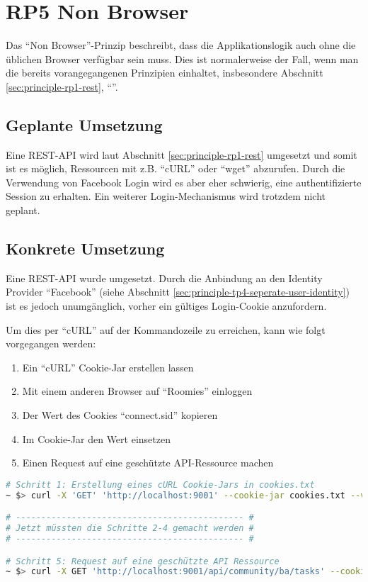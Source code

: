 \section{RP5 Non Browser}
\label{sec:principle-rp5-non-browser}

Das ``Non Browser''-Prinzip beschreibt, dass die Applikationslogik auch ohne die üblichen Browser verfügbar sein muss. Dies ist normalerweise der Fall, wenn man die bereits vorangegangenen Prinzipien einhaltet, insbesondere Abschnitt \ref{sec:principle-rp1-rest}, ``''.

\subsection*{Geplante Umsetzung}
Eine REST-API wird laut Abschnitt \ref{sec:principle-rp1-rest} umgesetzt und somit ist es möglich, Ressourcen mit z.B. ``cURL'' \cite{curl} oder ``wget'' \cite{wget} abzurufen.
Durch die Verwendung von Facebook Login wird es aber eher schwierig, eine authentifizierte Session zu erhalten. Ein weiterer Login-Mechanismus wird trotzdem nicht geplant.

\subsection*{Konkrete Umsetzung}
Eine REST-API wurde umgesetzt. Durch die Anbindung an den Identity Provider ``Facebook'' (siehe Abschnitt \ref{sec:principle-tp4-seperate-user-identity}) ist es jedoch unumgänglich, vorher ein gültiges Login-Cookie anzufordern.

Um dies per ``cURL'' auf der Kommandozeile zu erreichen, kann wie folgt vorgegangen werden:
\begin{enumerate}
	\item Ein ``cURL'' Cookie-Jar erstellen lassen
	\item Mit einem anderen Browser auf ``Roomies'' einloggen
	\item Der Wert des Cookies ``connect.sid'' kopieren
	\item Im Cookie-Jar den Wert einsetzen
	\item Einen Request auf eine geschützte API-Ressource machen
\end{enumerate}

\begin{lstlisting}[language=Bash, caption=cURL Request auf Roomies, label=lst:curlRoomiesAPI]
# Schritt 1: Erstellung eines cURL Cookie-Jars in cookies.txt
~ $> curl -X 'GET' 'http://localhost:9001' --cookie-jar cookies.txt --verbose --location

# --------------------------------------------- #
# Jetzt müssten die Schritte 2-4 gemacht werden #
# --------------------------------------------- #

# Schritt 5: Request auf eine geschützte API Ressource
~ $> curl -X GET 'http://localhost:9001/api/community/ba/tasks' --cookie cookies.txt  --verbose --location
\end{lstlisting}

